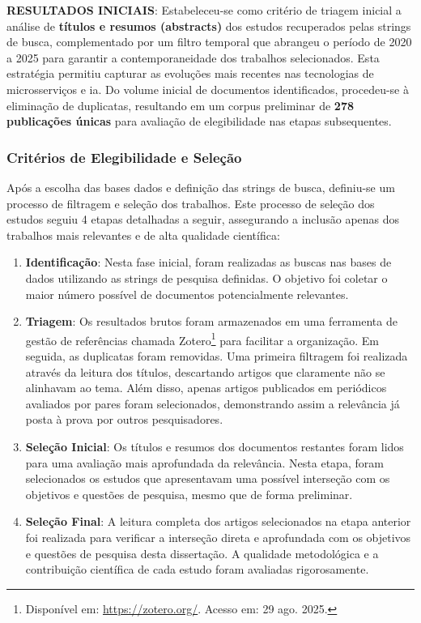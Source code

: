 \textbf{RESULTADOS INICIAIS}: Estabeleceu-se como critério de triagem inicial a análise de \textbf{títulos e resumos (abstracts)} dos estudos recuperados pelas strings de busca, complementado por um filtro temporal que abrangeu o período de 2020 a 2025 para garantir a contemporaneidade dos trabalhos selecionados. Esta estratégia permitiu capturar as evoluções mais recentes nas tecnologias de microsserviços e \gls{ia}. Do volume inicial de documentos identificados, procedeu-se à eliminação de duplicatas, resultando em um corpus preliminar de \textbf{278 publicações únicas} para avaliação de elegibilidade nas etapas subsequentes.


\subsubsection{Critérios de Elegibilidade e Seleção}

Após a escolha das bases dados e definição das strings de busca, definiu-se um processo de filtragem e seleção dos trabalhos. Este processo de seleção dos estudos seguiu 4 etapas detalhadas a seguir, assegurando a inclusão apenas dos trabalhos mais relevantes e de alta qualidade científica:
\begin{enumerate}
\item \textbf{Identificação}: Nesta fase inicial, foram realizadas as buscas nas bases de dados utilizando as strings de pesquisa definidas. O objetivo foi coletar o maior número possível de documentos potencialmente relevantes.
\item \textbf{Triagem}: Os resultados brutos foram armazenados em uma ferramenta de gestão de referências chamada Zotero\footnote{Disponível em: \url{https://zotero.org/}. Acesso em: 29 ago. 2025.} para facilitar a organização. Em seguida, as duplicatas foram removidas. Uma primeira filtragem foi realizada através da leitura dos títulos, descartando artigos que claramente não se alinhavam ao tema. Além disso, apenas artigos publicados em periódicos avaliados por pares foram selecionados, demonstrando assim a relevância já posta à prova por outros pesquisadores.
\item \textbf{Seleção Inicial}: Os títulos e resumos dos documentos restantes foram lidos para uma avaliação mais aprofundada da relevância. Nesta etapa, foram selecionados os estudos que apresentavam uma possível interseção com os objetivos e questões de pesquisa, mesmo que de forma preliminar.
\item \textbf{Seleção Final}: A leitura completa dos artigos selecionados na etapa anterior foi realizada para verificar a interseção direta e aprofundada com os objetivos e questões de pesquisa desta dissertação. A qualidade metodológica e a contribuição científica de cada estudo foram avaliadas rigorosamente.
\end{enumerate}

